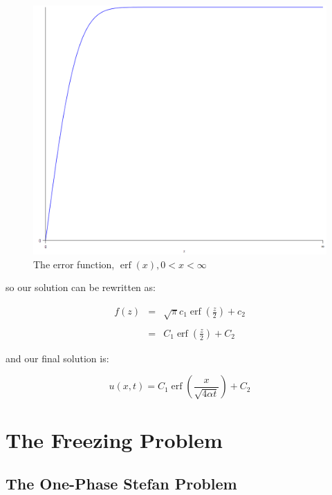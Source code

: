 \documentclass{report}
\DeclareMathOperator{\erf}{erf}
\begin{document}
\begin{figure}[t]
\centering
\includegraphics[scale = 0.15]{erf}
\caption{The error function, $\erf(x), 0 < x < \infty$}
\label{fig:erf}
\end{figure}

so our solution can be rewritten as:\bigskip

\begin{eqnarray*}  
  f(z) & = & \sqrt{\pi} c_1 \erf \left( \frac{z}{2} \right) + c_2 \\\\
       & = & C_1 \erf \left( \frac{z}{2} \right) + C_2
\end{eqnarray*}\medskip

and our final solution is:\bigskip

\[ u(x, t) = C_1 \erf \left( \frac{x}{\sqrt{4 \alpha t}} \right) + C_2 \]\medskip









\chapter{The Freezing Problem}



\section{The One-Phase Stefan Problem}
\end{document}
